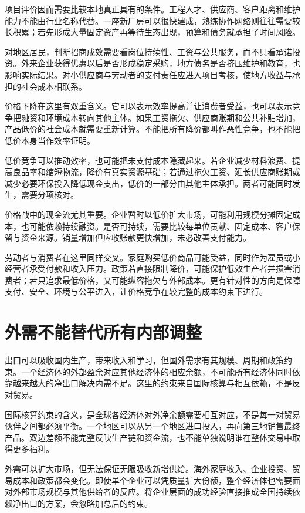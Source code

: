 \documentclass[UTF8,fontset=fandol,zihao=-4,oneside,openany]{ctexbook}
\begin{document}
项目评价因而需要比较本地真正具有的条件。工程人才、供应商、客户距离和维护能力不能由行业名称代替。一座新厂房可以很快建成，熟练协作网络则往往需要较长积累；若先形成大量固定资产再等待生态出现，预算和债务就承担了时间风险。

对地区居民，判断招商成效需要看岗位持续性、工资与公共服务，而不只看承诺投资。外来企业获得优惠以后是否形成稳定采购，地方债务是否挤压维护和教育，也影响实际结果。对小供应商与劳动者的支付责任应进入项目考核，使地方收益与承担的社会成本相联系。

价格下降在这里有双重含义。它可以表示效率提高并让消费者受益，也可以表示竞争把融资和环境成本转向其他主体。如果工资拖欠、供应商账期和公共补贴增加，产品低价的社会成本就需要重新计算。不能把所有降价都叫作恶性竞争，也不能把低价本身当作效率证明。

\label{arg:P216}
低价竞争可以推动效率，也可能把未支付成本隐藏起来。若企业减少材料浪费、提高良品率和缩短物流，降价有真实资源基础；若通过拖欠工资、延长供应商账期或减少必要环保投入降低现金支出，低价的一部分由其他主体承担。两者可能同时发生，需要分项核对。

价格战中的现金流尤其重要。企业暂时以低价扩大市场，可能利用规模分摊固定成本，也可能依赖持续融资。是否可持续，需要比较每单位贡献、固定成本、客户保留与资金来源。销量增加但应收账款更快增加，未必改善支付能力。

劳动者与消费者在这里同样交叉。家庭购买低价商品可能受益，同时作为雇员或小经营者承受付款和收入压力。政策若直接限制降价，可能保护低效生产者并损害消费者；若只追求最低价格，又可能纵容拖欠与外部成本。更有针对性的方向是保障支付、安全、环境与公平进入，让价格竞争在较完整的成本约束下进行。

\section{外需不能替代所有内部调整}
出口可以吸收国内生产，带来收入和学习，但国外需求有其规模、周期和政策约束。一个经济体的外部盈余对应其他经济体的相应余额，不可能所有经济体同时依靠越来越大的净出口解决内需不足。这里的约束来自国际核算与相互依赖，不是反对贸易。

\label{arg:P217}
国际核算约束的含义，是全球各经济体对外净余额需要相互对应，不是每一对贸易伙伴之间都必须平衡。一个地区可以从另一个地区进口投入，再向第三地销售最终产品。双边差额不能完整反映生产链和资金流，也不能单独说明谁在整体交易中取得更多福利。

外需可以扩大市场，但无法保证无限吸收新增供给。海外家庭收入、企业投资、贸易成本和政策都会变化。即使单个企业可以凭质量扩大份额，整个经济体也需要面对外部市场规模与其他供给者的反应。将企业层面的成功经验直接推成全国持续依赖净出口的方案，会忽略加总后的约束。
\end{document}
